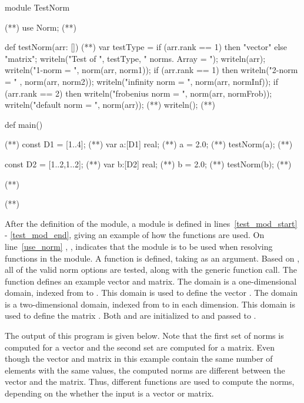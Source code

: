 \begin{numberedchapel}
module TestNorm { (*\label{test_mod_start}*)
  use Norm;  (*\label{use_norm}*)

  def testNorm(arr: []) { (*\label{test_start}*)
    var testType = if (arr.rank == 1) then "vector" else "matrix"; 
    writeln("Test of ", testType, " norms.  Array = ");
    writeln(arr);
    writeln("1-norm = ", norm(arr, norm1));
    if (arr.rank == 1) then
      writeln("2-norm = " , norm(arr, norm2));
    writeln("infinity norm = ", norm(arr, normInf));
    if (arr.rank == 2) then
      writeln("frobenius norm = ", norm(arr, normFrob));
    writeln("default norm = ", norm(arr)); (*\label{default_call}*)
    writeln();
  } (*\label{test_end}*)

  def main() {  (*\label{test_main_start}*)
    const D1 = [1..4];  (*\label{test_d1_def}*)
    var a:[D1] real;    (*\label{test_a_def}*)
    a = 2.0;            (*\label{test_a_init}*)
    testNorm(a);        (*\label{testnorm_a_call}*)

    const D2 = [1..2,1..2];  (*\label{test_d2_def}*)
    var b:[D2] real;         (*\label{test_b_def}*)
    b = 2.0;                 (*\label{test_b_init}*)
    testNorm(b);             (*\label{testnorm_b_call}*)
  }            (*\label{test_main_end}*)
}              (*\label{test_mod_end}*)
\end{numberedchapel}

After the definition of the  module, a  module
is defined in lines~\ref{test_mod_start} - \ref{test_mod_end}, giving 
an example of how the  functions are used.
On line~\ref{use_norm} , , indicates that the  module is to be
used when resolving functions in the  module.  A 
function is defined, taking  as an argument.  Based on ,
all of the valid norm options are tested, along with the generic 
function call.  The  function defines an example vector and matrix.
The domain  is a one-dimensional domain, indexed
from  to .  This domain is used to define the vector
.  The domain  is a two-dimensional domain, indexed from 
to  in each dimension.  This domain is used to define the matrix .
Both  and  are initialized to  and passed to
.

The output of this program is given below.  Note that the first set
of norms is computed for a vector and the second set are computed for
a matrix. Even though the vector and matrix in this example contain
the same number of elements with the same values, the computed norms
are different between the vector and the matrix.  Thus, different
functions are used to compute the norms, depending on the whether the
input is a vector or matrix.

